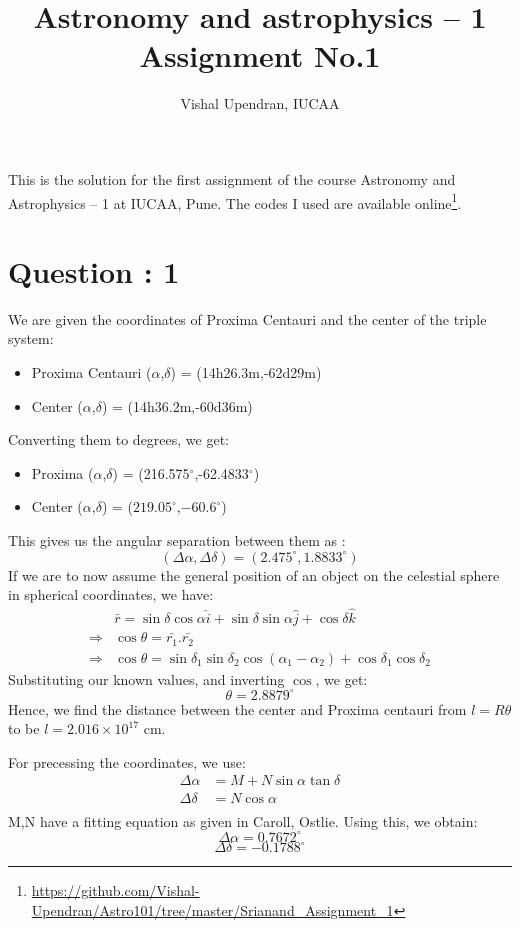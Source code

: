 \documentclass{article}
\begin{document}
\title{Astronomy and astrophysics -- 1 \\
	   \large Assignment No.1 }
\author{Vishal Upendran, IUCAA}
\maketitle

This is the solution for the first assignment of the course Astronomy and Astrophysics -- 1 at IUCAA, Pune. The codes I used are available online\footnote{\url{https://github.com/Vishal-Upendran/Astro101/tree/master/Srianand_Assignment_1}}. 
\section{Question : 1}
We are given the coordinates of Proxima Centauri and the center of the triple system:
\begin{itemize}
\item Proxima Centauri ($\alpha$,$\delta$) = (14h26.3m,-62d29m)
\item Center ($\alpha$,$\delta$) = (14h36.2m,-60d36m)
\end{itemize}
Converting them to degrees, we get:
\begin{itemize}
\item Proxima ($\alpha$,$\delta$) = (216.575$^\circ$,-62.4833$^\circ$)
\item Center ($\alpha$,$\delta$) = ($219.05^\circ$,$-60.6^\circ$)
\end{itemize}
This gives us the angular separation between them as :
$$(\Delta\alpha,\Delta\delta) = (2.475^\circ,1.8833^\circ)$$
If we are to now assume the general position of an object on the celestial sphere in spherical coordinates, we have:
\begin{equation}
\begin{split}
&\bar{r} = \sin\delta\cos\alpha \hat{i} + \sin\delta\sin\alpha \hat{j}+\cos\delta \hat{k} \\
\Rightarrow &\cos\theta = \bar{r_1}.\bar{r_2} \\
\Rightarrow &\cos\theta = \sin\delta_1 \sin\delta_2 \cos(\alpha_1-\alpha_2)+\cos\delta_1\cos\delta_2
\end{split}
\end{equation}
Substituting our known values, and inverting $\cos$, we get:
$$\theta = 2.8879^\circ$$
Hence, we find the distance between the center and Proxima centauri from $l=R\theta$to be $l=2.016\times10^{17}$ cm.

For precessing the coordinates, we use:
\begin{equation}
\begin{split}
\Delta \alpha &= M+ N\sin\alpha \tan\delta \\
\Delta \delta &= N\cos\alpha \\
\end{split}
\end{equation}
M,N have a fitting equation as given in Caroll, Ostlie. Using this, we obtain: $$\Delta\alpha = 0.7672^\circ $$ $$\Delta \delta  = -0.1788^\circ$$ 
\end{document}
